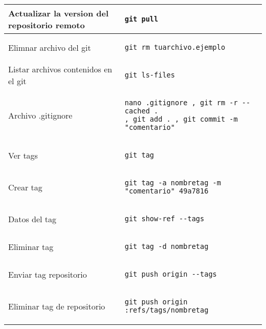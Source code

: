 \documentclass[landscape]{article}
\begin{document}
\begin{table}[ht]
\begin{center}
\begin{tabular}{| l | l |}
Actualizar la version del repositorio remoto &
\begin{lstlisting}
git pull 
\end{lstlisting}\\ \hline

Elimnar archivo del git &
\begin{lstlisting}
git rm tuarchivo.ejemplo
\end{lstlisting}\\ \hline

Listar archivos contenidos en el git &
\begin{lstlisting}
git ls-files
\end{lstlisting}\\ \hline

Archivo .gitignore &
\begin{lstlisting}
nano .gitignore , git rm -r --cached . 
, git add . , git commit -m "comentario"
\end{lstlisting}\\ \hline

Ver tags &
\begin{lstlisting}
git tag
\end{lstlisting}\\ \hline

Crear tag &
\begin{lstlisting}
git tag -a nombretag -m "comentario" 49a7816 
\end{lstlisting}\\ \hline

Datos del tag &
\begin{lstlisting}
git show-ref --tags
\end{lstlisting}\\ \hline

Eliminar tag &
\begin{lstlisting}
git tag -d nombretag
\end{lstlisting}\\ \hline

Enviar tag repositorio &
\begin{lstlisting}
git push origin --tags
\end{lstlisting}\\ \hline

Eliminar tag de repositorio &
\begin{lstlisting}
git push origin :refs/tags/nombretag
\end{lstlisting}\\ \hline



\end{tabular}
\end{center}
\end{table}
\end{document}
